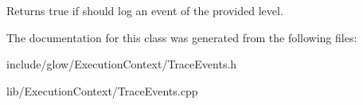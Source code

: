 \begin{DoxyReturn}{Returns}
true if should log an event of the provided {\ttfamily level}. 
\end{DoxyReturn}


The documentation for this class was generated from the following files\+:\begin{DoxyCompactItemize}
\item 
include/glow/\+Execution\+Context/Trace\+Events.\+h\item 
lib/\+Execution\+Context/Trace\+Events.\+cpp\end{DoxyCompactItemize}
